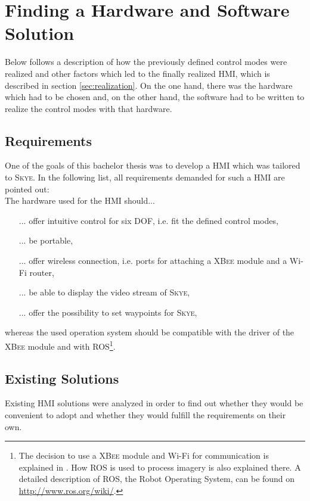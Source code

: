 \graphicspath{{graphics/HMI/}{graphics/control_modes/}}
\chapter{Finding a Hardware and Software Solution}
\label{cha:findHardSoftSolution}
Below follows a description of how the previously defined control modes were realized and other factors which led to the finally realized HMI, which is described in section \ref{sec:realization}. On the one hand, there was the hardware which had to be chosen and, on the other hand, the software had to be written to realize the control modes with that hardware.



\section{Requirements}
\label{sec:requirements}
One of the goals of this bachelor thesis was to develop a HMI which was tailored to \textsc{Skye}. In the following list, all requirements demanded for such a HMI are pointed out: \\

The hardware used for the HMI should...
\begin{itemize}
\item[...]{offer intuitive control for six DOF, i.e. fit the defined control modes, }
\item[...]{be portable,}
\item[...]{offer wireless connection, i.e. ports for attaching a \textsc{XBee} module and a Wi-Fi router,}
\item[...]{be able to display the video stream of \textsc{Skye},}
\item[...]{offer the possibility to set waypoints for \textsc{Skye},}
\end{itemize}
whereas the used operation system should be compatible with the driver of the \textsc{XBee} module and with \textsc{ROS}\footnote{The decision to use a \textsc{XBee} module and Wi-Fi for communication is explained in \cite{burri}. How \textsc{ROS} is used to process imagery is also explained there. A detailed description of \textsc{ROS}, the Robot Operating System, can be found on \url{http://www.ros.org/wiki/}.}.

\section{Existing Solutions}
\label{sec:existingSolutions}
Existing HMI solutions were analyzed in order to find out whether they would be convenient to adopt and whether they would fulfill the requirements on their own. 

